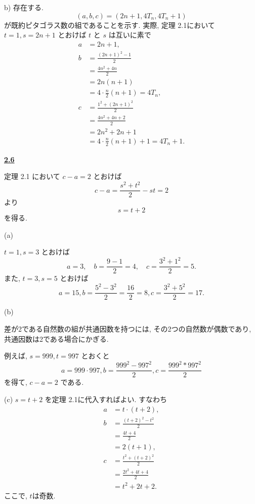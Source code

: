 \documentclass{jarticle}
\newcommand{\cnt}[1]{\noindent \underline{\textbf{#1}}}
\begin{document}
\noindent b) %
存在する.
\[
  (a, b, c) = (2n+1, 4T_n, 4T_n + 1)
\]
が既約ピタゴラス数の組であることを示す.
実際, 定理 2.1において $t=1, s=2n+1$ とおけば $t$ と $s$ は互いに素で
\begin{align*}
a &= 2n + 1, \\
b
  &= \frac{(2n+1)^2 - 1}{2} \\
  &= \frac{4n^2 + 4n}{2} \\
  &= 2n(n+1) \\
  &= 4 \cdot \frac{n}{2} (n+1) = 4T_n, \\
c
  &= \frac{1^2 + (2n+1)^2}{2} \\
  &= \frac{4n^2 + 4n + 2}{2} \\
  &= 2n^2 + 2n + 1 \\
  &= 4 \cdot \frac{n}{2} (n+1) + 1 = 4T_n + 1.
\end{align*}


\cnt{2.6} %

定理 2.1 において $c - a = 2$ とおけば
\[
  c - a = \frac{s^2 + t^2}{2} - st = 2
\]
より
\[
  s = t + 2
\]
を得る.


\noindent (a) %

$t = 1, s = 3$ とおけば
\[
  a = 3, \quad
  b = \frac{9 - 1}{2} = 4, \quad
  c = \frac{3^2 + 1^2}{2} = 5.
\]
また, $t=3, s=5$ とおけば
\[
  a = 15,
  b = \frac{5^2 - 3^2}{2} = \frac{16}{2} = 8,
  c = \frac{3^2 + 5^2}{2} = 17.
\]

\noindent (b) %

差が2である自然数の組が共通因数を持つには, その2つの自然数が偶数であり,
共通因数は2である場合にかぎる.

例えば, $s = 999, t = 997$ とおくと
\[
  a = 999 \cdot 997,
  b = \frac{999^2 - 997^2}{2},
  c = \frac{999^2 * 997^2}{2}
\]
を得て, $c - a = 2$ である.

\noindent (c) %
$s = t + 2$ を定理 2.1に代入すればよい.
すなわち
\begin{align*}
  a &= t \cdot (t+2), \\
  b
    &= \frac{(t+2)^2 - t^2}{2} \\
    &= \frac{4t+4}{2} \\
    &= 2(t+1), \\
c
  &= \frac{t^2 + (t + 2)^2}{2} \\
  &= \frac{2t^2 + 4t + 4}{2} \\
  &= t^2 + 2t + 2.
\end{align*}
ここで, $t$は奇数.
\end{document}
